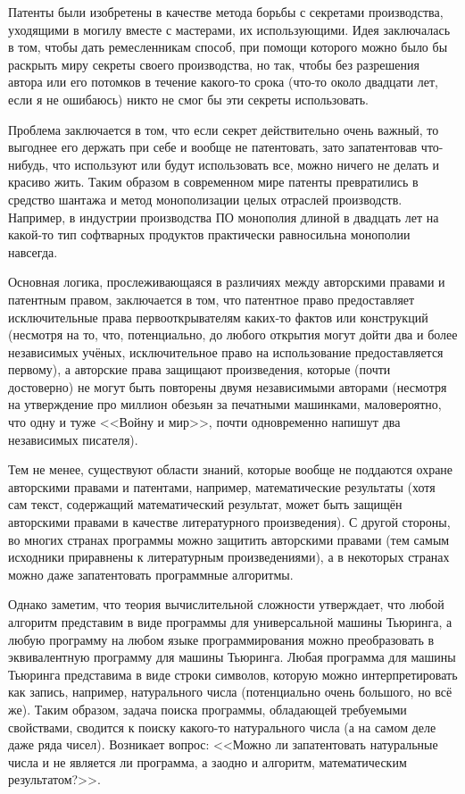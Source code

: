 Патенты были изобретены в качестве метода борьбы с секретами производства, уходящими в могилу вместе с мастерами, их использующими.
Идея заключалась в том, чтобы дать ремесленникам способ, при помощи которого можно было бы раскрыть миру секреты своего производства, но так, чтобы без разрешения автора или его потомков в течение какого-то срока (что-то около двадцати лет, если я не ошибаюсь) никто не смог бы эти секреты использовать.

Проблема заключается в том, что если секрет действительно очень важный, то выгоднее его держать при себе и вообще не патентовать, зато запатентовав что-нибудь, что используют или будут использовать все, можно ничего не делать и красиво жить.
Таким образом в современном мире патенты превратились в средство шантажа и метод монополизации целых отраслей производств.
Например, в индустрии производства ПО монополия длиной в двадцать лет на какой-то тип софтварных продуктов практически равносильна монополии навсегда.

Основная логика, прослеживающаяся в различиях между авторскими правами и патентным правом, заключается в том, что патентное право предоставляет исключительные права первооткрывателям каких-то фактов или конструкций (несмотря на то, что, потенциально, до любого открытия могут дойти два и более независимых учёных, исключительное право на использование предоставляется первому), а авторские права защищают произведения, которые (почти достоверно) не могут быть повторены двумя независимыми авторами (несмотря на утверждение про миллион обезьян за печатными машинками, маловероятно, что одну и туже <<Войну и мир>>, почти одновременно напишут два независимых писателя).

Тем не менее, существуют области знаний, которые вообще не поддаются охране авторскими правами и патентами, например, математические результаты (хотя сам текст, содержащий математический результат, может быть защищён авторскими правами в качестве литературного произведения).
С другой стороны, во многих странах программы можно защитить авторскими правами (тем самым исходники приравнены к литературным произведениями), а в некоторых странах можно даже запатентовать программные алгоритмы.

Однако заметим, что теория вычислительной сложности утверждает, что любой алгоритм представим в виде программы для универсальной машины Тьюринга, а любую программу на любом языке программирования можно преобразовать в эквивалентную программу для машины Тьюринга.
Любая программа для машины Тьюринга представима в виде строки символов, которую можно интерпретировать как запись, например, натурального числа (потенциально очень большого, но всё же).
Таким образом, задача поиска программы, обладающей требуемыми свойствами, сводится к поиску какого-то натурального числа (а на самом деле даже ряда чисел).
Возникает вопрос: <<Можно ли запатентовать натуральные числа и не является ли программа, а заодно и алгоритм, математическим результатом?>>.

